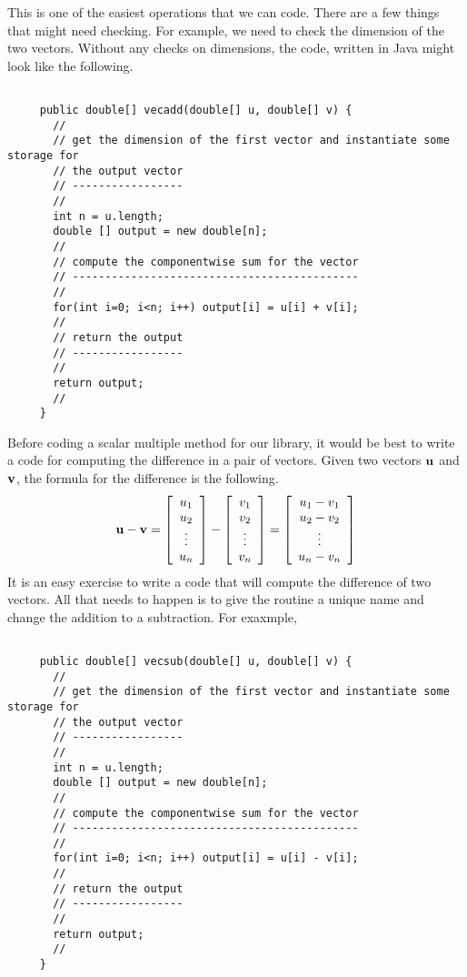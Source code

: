 \documentclass[10pt,fleqn]{article}
\begin{document}
This is one of the easiest operations that we can code. There are a few things
that might need checking. For example, we need to check the dimension of the two
vectors. Without any checks on dimensions, the code, written in Java might look
like the following.
\begin{verbatim}

     public double[] vecadd(double[] u, double[] v) {
       //
       // get the dimension of the first vector and instantiate some storage for
       // the output vector
       // -----------------
       //
       int n = u.length;
       double [] output = new double[n];
       //
       // compute the componentwise sum for the vector
       // --------------------------------------------
       //
       for(int i=0; i<n; i++) output[i] = u[i] + v[i];
       //
       // return the output
       // -----------------
       //
       return output;
       //
     }

\end{verbatim}
Before coding a scalar multiple method for our library, it would be best to
write a code for computing the difference in a pair of vectors. Given two
vectors ${\bf u}$ and ${\bf v}$, the formula for the difference is the
following.
$$
  {\bf u} - {\bf v} = 
       \left[
         \begin{array}{c}
           u_1 \\
           u_2 \\
           \vdots \\
           u_n
         \end{array}
       \right]
     - \left[
         \begin{array}{c}
           v_1 \\
           v_2 \\
           \vdots \\
           v_n
         \end{array}
       \right]
     = \left[
         \begin{array}{c}
           u_1 - v_1 \\
           u_2 - v_2 \\
           \vdots \\
           u_n - v_n
         \end{array}
       \right]
$$
It is an easy exercise to write a code that will compute the difference of two
vectors. All that needs to happen is to give the routine a unique name and
change the addition to a subtraction. For exaxmple,
\begin{verbatim}

     public double[] vecsub(double[] u, double[] v) {
       //
       // get the dimension of the first vector and instantiate some storage for
       // the output vector
       // -----------------
       //
       int n = u.length;
       double [] output = new double[n];
       //
       // compute the componentwise sum for the vector
       // --------------------------------------------
       //
       for(int i=0; i<n; i++) output[i] = u[i] - v[i];
       //
       // return the output
       // -----------------
       //
       return output;
       //
     }

\end{verbatim}
\end{document}
